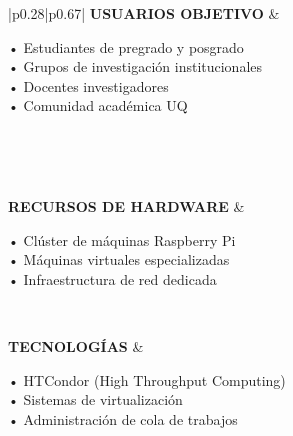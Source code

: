 \begin{table}[H]
\begin{tabular}{|p{0.28\textwidth}|p{0.67\textwidth}|}
		\textbf{USUARIOS OBJETIVO}         &
		\begin{minipage}[t]{\linewidth}
			\vspace{2pt}
			• Estudiantes de pregrado y posgrado \\
			• Grupos de investigación institucionales \\
			• Docentes investigadores \\
			• Comunidad académica UQ
			\vspace{2pt}
		\end{minipage}                                                                                                                                                                                                                                     \\ \hline

		                                                                                                                                                                                                    \\ \hline

		\textbf{RECURSOS DE HARDWARE}      &
		\begin{minipage}[t]{\linewidth}
			\vspace{2pt}
			• Clúster de máquinas Raspberry Pi \\
			• Máquinas virtuales especializadas \\
			• Infraestructura de red dedicada
			\vspace{2pt}
		\end{minipage}                                                                                                                                                                                                                                           \\ \hline

		\textbf{TECNOLOGÍAS}               &
		\begin{minipage}[t]{\linewidth}
			\vspace{2pt}
			• HTCondor (High Throughput Computing) \\
			• Sistemas de virtualización \\
			• Administración de cola de trabajos
			\vspace{2pt}
		\end{minipage}                                                                                                                                                                                                                                        \\ \hline


\end{tabular}
\end{table}
